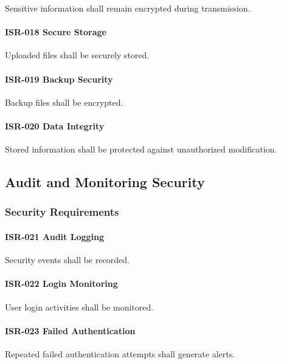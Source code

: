 Sensitive information shall remain encrypted during transmission.

\paragraph{ISR-018 Secure Storage}

Uploaded files shall be securely stored.

\paragraph{ISR-019 Backup Security}

Backup files shall be encrypted.

\paragraph{ISR-020 Data Integrity}

Stored information shall be protected against unauthorized
modification.


\subsection{Audit and Monitoring Security}

\subsubsection*{Security Requirements}

\paragraph{ISR-021 Audit Logging}

Security events shall be recorded.

\paragraph{ISR-022 Login Monitoring}

User login activities shall be monitored.

\paragraph{ISR-023 Failed Authentication}

Repeated failed authentication attempts shall generate alerts.

